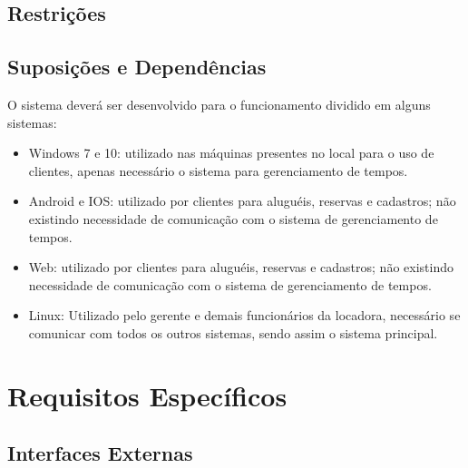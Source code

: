 \documentclass{article}
\begin{document}
    
    \subsection{Restrições}
    \subsection{Suposições e Dependências}
    O sistema deverá ser desenvolvido para o funcionamento dividido em alguns sistemas:
    \begin{itemize}
        \item Windows 7 e 10: utilizado nas máquinas presentes no local para o uso de clientes, apenas necessário o sistema para gerenciamento de tempos.
        \item Android e IOS: utilizado por clientes para aluguéis, reservas e cadastros; não existindo necessidade de comunicação com o sistema de gerenciamento de tempos.
        \item Web: utilizado por clientes para aluguéis, reservas e cadastros; não existindo necessidade de comunicação com o sistema de gerenciamento de tempos.
        \item Linux: Utilizado pelo gerente e demais funcionários da locadora, necessário se comunicar com todos os outros sistemas, sendo assim o sistema principal.
    \end{itemize}
    
  \section{Requisitos Específicos}    
        
    \subsection{Interfaces Externas}        
        
\end{document}
